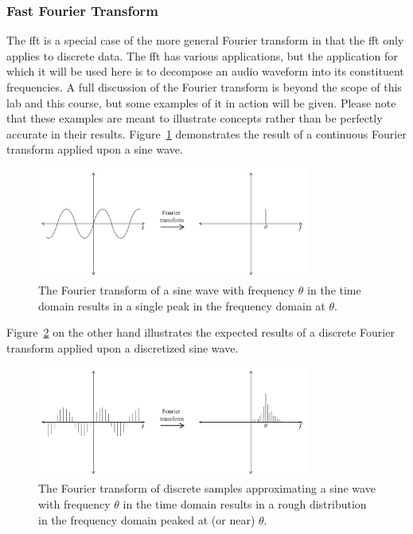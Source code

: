 \subsubsection{Fast Fourier Transform}
The \ac{fft} is a special case of the more general Fourier transform in that the \ac{fft} only applies to discrete data.
The \ac{fft} has various applications, but the application for which it will be used here is to decompose an audio waveform into its constituent frequencies.
A full discussion of the Fourier transform is beyond the scope of this lab and this course, but some examples of it in action will be given.
Please note that these examples are meant to illustrate concepts rather than be perfectly accurate in their results.
Figure~\ref{fig:cft} demonstrates the result of a continuous Fourier transform applied upon a sine wave.
\begin{figure}[h]
\centering
\includegraphics[width=0.8\textwidth]{CFT.pdf}
\caption{The Fourier transform of a sine wave with frequency $\theta$ in the time domain results in a single peak in the frequency domain at $\theta$.}
\label{fig:cft}
\end{figure}
Figure~\ref{fig:dft} on the other hand illustrates the expected results of a discrete Fourier transform applied upon a discretized sine wave.
\begin{figure}[h]
\centering
\includegraphics[width=0.8\textwidth]{DFT.pdf}
\caption{The Fourier transform of discrete samples approximating a sine wave with frequency $\theta$ in the time domain results in a rough distribution in the frequency domain peaked at (or near) $\theta$.}
\label{fig:dft}
\end{figure}
